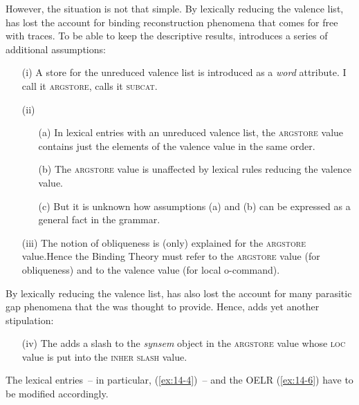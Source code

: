 \documentclass[output=paper]{LSP/langsci}
\begin{document}
\addlines[2]
\randnum\label{rn:14-20}However, the situation is not that simple. By
lexically reducing the valence list, \citet[Ch.~9]{PollardSagE1994} has lost the account
for binding reconstruction phenomena that comes for free with
traces. To be able to keep the descriptive results, \citet{PollardSagE1994} introduces a
series of additional assumptions:
\begin{enumerate}
\item[(i)] A store for the unreduced valence list is introduced as a \textit{word} attribute. I call it \textsc{argstore}, \citet{PollardSagE1994} calls it \textsc{subcat}.
\item[(ii)]
\begin{enumerate}
\item[(a)] In lexical entries with an unreduced valence list, the \textsc{argstore} value contains just the elements of the valence value in the same order.
\item[(b)] The \textsc{argstore} value is unaffected by lexical rules reducing the valence value.
\item[(c)] But it is unknown how assumptions (a) and (b) can be expressed as a general fact in the grammar.
\end{enumerate}
\item[(iii)] The notion of obliqueness is (only) explained for the \textsc{argstore} value.\linebreak Hence the Binding Theory must refer to the \textsc{argstore} value (for obliqueness) and to the valence value (for local o-command).
\end{enumerate}
\randnum\label{rn:14-21}By lexically reducing the valence list, \citet{PollardSagE1994} has also lost the account for many parasitic gap phenomena that the  was thought to provide. Hence, \citet{PollardSagE1994} adds yet another stipulation:
\begin{enumerate}
\item[(iv)] The  adds a slash to the \textit{synsem} object in the \textsc{argstore} value whose \textsc{loc} value is put into the \textsc{inher} \textsc{slash} value.
\end{enumerate}
\pagebreak
\randnum\label{rn:14-22}The lexical entries~-- in particular, (\ref{ex:14-4})~-- and the OELR (\ref{ex:14-6}) have to be modified accordingly.
\end{document}
